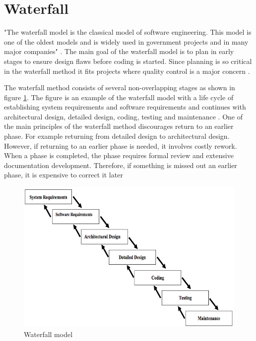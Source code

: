 \documentclass[UKenglish]{ifimaster}  %
\begin{document}
\section {Waterfall}
\label{sec:WP}
"The waterfall model is the classical model of software engineering. This model is one of the oldest models and is widely used in government projects and in many major companies" \parencite{munassar2010comparison}. The main goal of the waterfall model is to plan in early stages to ensure design flaws before coding is started. Since planning is so critical in the waterfall method it fits projects where quality control is a major concern  \parencite{munassar2010comparison}.

The waterfall method consists of several non-overlapping stages as shown in figure \ref{fig:waterfall}. The figure is an example of the waterfall model with a life cycle of establishing system requirements and software requirements and continues with architectural design, detailed design, coding, testing and maintenance  \parencite{munassar2010comparison}. One of the main principles of the waterfall method discourages return to an earlier phase. For example returning from detailed design to architectural design. However, if returning to an earlier phase is needed, it involves costly rework. When a phase is completed, the phase requires formal review and extensive documentation development. Therefore, if something is missed out an earlier phase, it is expensive to correct it later  \parencite{munassar2010comparison}


\begin{figure}[ht!]
\centering
\includegraphics[scale=0.7]{Picture/waterfall.jpg}
\caption{Waterfall model}
\label{fig:waterfall} %
\end{figure}
\end{document}
